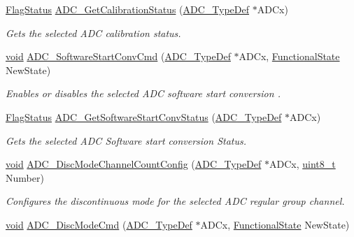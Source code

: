 \begin{DoxyCompactItemize}
\hyperlink{agilefox_2library_2inc_2stm32f10x__type_8h_a89136caac2e14c55151f527ac02daaff}{Flag\+Status} \hyperlink{group___a_d_c___private___functions_ga7a728f699b487c7fa1694d7424967122}{A\+D\+C\+\_\+\+Get\+Calibration\+Status} (\hyperlink{struct_a_d_c___type_def}{A\+D\+C\+\_\+\+Type\+Def} $\ast$A\+D\+Cx)
\begin{DoxyCompactList}\small\item\em Gets the selected A\+DC calibration status. \end{DoxyCompactList}\item 
\hyperlink{usb__devapi_8h_afabf60e7f57651d6d595a02c75f07cd0}{void} \hyperlink{group___a_d_c___private___functions_ga694130a8d1ad3c8877b7eddb29611b30}{A\+D\+C\+\_\+\+Software\+Start\+Conv\+Cmd} (\hyperlink{struct_a_d_c___type_def}{A\+D\+C\+\_\+\+Type\+Def} $\ast$A\+D\+Cx, \hyperlink{agilefox_2library_2inc_2stm32f10x__type_8h_ac9a7e9a35d2513ec15c3b537aaa4fba1}{Functional\+State} New\+State)
\begin{DoxyCompactList}\small\item\em Enables or disables the selected A\+DC software start conversion . \end{DoxyCompactList}\item 
\hyperlink{agilefox_2library_2inc_2stm32f10x__type_8h_a89136caac2e14c55151f527ac02daaff}{Flag\+Status} \hyperlink{group___a_d_c___private___functions_gaf1119583782ecbcec380efcb7eb74883}{A\+D\+C\+\_\+\+Get\+Software\+Start\+Conv\+Status} (\hyperlink{struct_a_d_c___type_def}{A\+D\+C\+\_\+\+Type\+Def} $\ast$A\+D\+Cx)
\begin{DoxyCompactList}\small\item\em Gets the selected A\+DC Software start conversion Status. \end{DoxyCompactList}\item 
\hyperlink{usb__devapi_8h_afabf60e7f57651d6d595a02c75f07cd0}{void} \hyperlink{group___a_d_c___private___functions_ga6eb241ba82d67d1371136c9132083937}{A\+D\+C\+\_\+\+Disc\+Mode\+Channel\+Count\+Config} (\hyperlink{struct_a_d_c___type_def}{A\+D\+C\+\_\+\+Type\+Def} $\ast$A\+D\+Cx, \hyperlink{_p_e___types_8h_aba7bc1797add20fe3efdf37ced1182c5}{uint8\+\_\+t} Number)
\begin{DoxyCompactList}\small\item\em Configures the discontinuous mode for the selected A\+DC regular group channel. \end{DoxyCompactList}\item 
\hyperlink{usb__devapi_8h_afabf60e7f57651d6d595a02c75f07cd0}{void} \hyperlink{group___a_d_c___private___functions_ga1909649d10253ce88d986ffbb94a4be6}{A\+D\+C\+\_\+\+Disc\+Mode\+Cmd} (\hyperlink{struct_a_d_c___type_def}{A\+D\+C\+\_\+\+Type\+Def} $\ast$A\+D\+Cx, \hyperlink{agilefox_2library_2inc_2stm32f10x__type_8h_ac9a7e9a35d2513ec15c3b537aaa4fba1}{Functional\+State} New\+State)

\end{DoxyCompactItemize}
